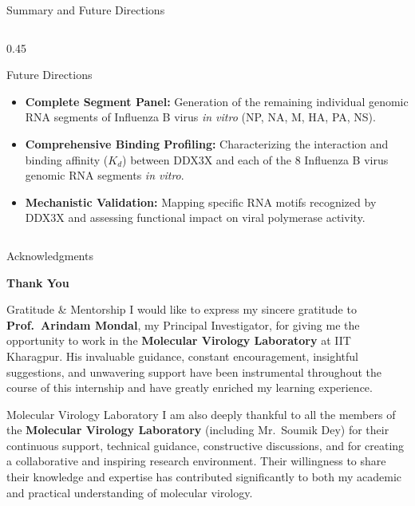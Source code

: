 \documentclass[aspectratio=169, 10pt]{beamer}
\begin{document}
\begin{frame}{Summary and Future Directions}
\begin{columns}[T]
    \begin{column}{0.45\textwidth}
      \begin{exampleblock}{Future Directions}
        \begin{itemize}
          \setlength\itemsep{0.65em}
          \item \textbf{Complete Segment Panel:} Generation of the remaining individual genomic RNA segments of Influenza B virus \textit{in vitro} (NP, NA, M, HA, PA, NS).
          \item \textbf{Comprehensive Binding Profiling:} Characterizing the interaction and binding affinity ($K_d$) between DDX3X and each of the 8 Influenza B virus genomic RNA segments \textit{in vitro}.
          \item \textbf{Mechanistic Validation:} Mapping specific RNA motifs recognized by DDX3X and assessing functional impact on viral polymerase activity.
        \end{itemize}
      \end{exampleblock}
    \end{column}
  \end{columns}
\end{frame}

\begin{frame}{Acknowledgments}
  \begin{center}
    {\Huge\bfseries\color{navyprimary} Thank You}
  \end{center}
  \vspace{0.25cm}
  \begin{block}{Gratitude \& Mentorship}
    \small
    I would like to express my sincere gratitude to \textbf{Prof.\ Arindam Mondal}, my Principal Investigator, for giving me the opportunity to work in the \textbf{Molecular Virology Laboratory} at IIT Kharagpur. His invaluable guidance, constant encouragement, insightful suggestions, and unwavering support have been instrumental throughout the course of this internship and have greatly enriched my learning experience.
  \end{block}
  \vspace{0.2cm}
  \begin{exampleblock}{Molecular Virology Laboratory}
    \small
    I am also deeply thankful to all the members of the \textbf{Molecular Virology Laboratory} (including Mr.\ Soumik Dey) for their continuous support, technical guidance, constructive discussions, and for creating a collaborative and inspiring research environment. Their willingness to share their knowledge and expertise has contributed significantly to both my academic and practical understanding of molecular virology.
  \end{exampleblock}
\end{frame}
\end{document}
